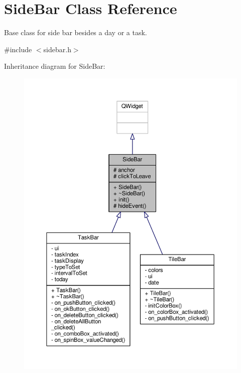 \hypertarget{classSideBar}{}\section{Side\+Bar Class Reference}
\label{classSideBar}


Base class for side bar besides a day or a task.  




{\ttfamily \#include $<$sidebar.\+h$>$}



Inheritance diagram for Side\+Bar\+:
\nopagebreak
\begin{figure}[H]
\begin{center}
\leavevmode
\includegraphics[width=350pt]{classSideBar__inherit__graph}
\end{center}
\end{figure}


